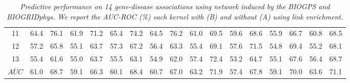 \documentclass[runningheads,a4paper]{llncs}
\begin{document}
\begin{table*}[!htbp]
\begin{tabular}{|c|c|g|c|g|c|g|c|g|c|g|c|g|c|g|c|g|}
11 & 64.4 & 76.1 & 61.9 & 71.2 & 65.4 & 74.2 & 64.5 & 76.2 & 61.0 & 69.5 & 59.6 & 68.6 & 55.9 & 66.7 & 60.8 & 68.5 \\
12 & 57.2 & 65.8 & 55.1 & 63.7 & 57.3 & 67.2 & 56.4 & 63.3 & 55.4 & 69.1 & 57.6 & 71.5 & 54.8 & 69.4 & 55.2 & 68.1 \\
13 & 55.4 & 61.6 & 55.0 & 63.7 & 55.5 & 63.1 & 54.9 & 62.0 & 57.4 & 72.4 & 53.2 & 64.7 & 55.1 & 67.6 & 56.4 & 68.7 \\
\hline
$\overline{AUC}$ & 61.0 & 68.7 & 59.1 & 66.3 & 60.1 & 68.4 & 60.7 & 67.0 & 63.2 & 71.9 & 57.4 & 67.8 & 59.1 & 70.0 & 63.6 & 71.1 \\
\hline
\end{tabular}
\caption{\textit {Predictive performance on 14 gene-disease associations using network induced by the BIOGPS and BIOGRIDphys. We report the AUC-ROC (\%) each kernel with (B) and without (A) using link enrichment.}}
\label{table:results1}
\end{table*}
\end{document}
